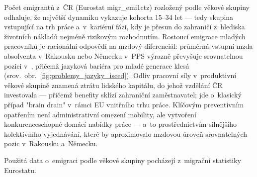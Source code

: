 Počet emigrantů z~ČR (Eurostat migr\_emi1ctz) rozložený podle věkové skupiny odhaluje, že největší dynamiku vykazuje kohorta 15--34 let --- tedy skupina vstupující na trh práce a~v~kariérní fázi, kdy je přesun do zahraničí z~hlediska životních nákladů nejméně rizikovým rozhodnutím.
Rostoucí emigrace mladých pracovníků je racionální odpovědí na mzdový diferenciál: průměrná vstupní mzda absolventa v~Rakousku nebo Německu v~\ac{PPS} výrazně převyšuje srovnatelnou pozici v~, přičemž jazyková bariéra pro mladé generace klesá (srov.~obr.~\ref{fig:problemy_jazyky_isced}).
Odliv pracovní síly v~produktivní věkové skupině znamená ztrátu lidského kapitálu, do jehož vzdělání \ac{ČR} investovala --- přičemž benefity sklízí zahraniční zaměstnavatel; jde o~klasický případ "brain drain" v~rámci \ac{EU} vnitřního trhu práce.
Klíčovým preventivním opatřením není administrativní omezení mobility, ale vytvoření konkurenceschopné domácí nabídky práce --- a~to prostřednictvím silnějšího kolektivního vyjednávání, které by aproximovalo mzdovou úroveň srovnatelných pozic v~Rakousku a~Německu.

Použitá data o~emigraci podle věkové skupiny pocházejí z~migrační statistiky Eurostatu.\par


